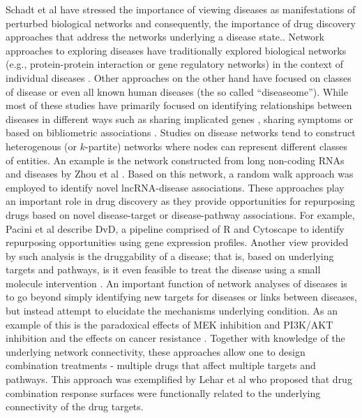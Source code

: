 \documentclass[]{book}
\begin{document}
Schadt et al \cite{Schadt:2009zl} have stressed the importance of
viewing diseases as manifestations of perturbed biological networks
and consequently, the importance of drug discovery approaches that
address the networks underlying a disease state.. Network approaches
to exploring diseases have traditionally explored biological networks
(e.g., protein-protein interaction or gene regulatory networks) in the
context of individual diseases \cite{Lim:2006fe,
  Altieri:2008aa}. Other approaches on the other hand have focused on
classes of disease \cite{Zhang:2013tx} or even all known human
diseases \cite{Goh:2007aa} (the so called ``diseaseome''). While most
of these studies have primarily focused on identifying relationships
between diseases in different ways such as sharing implicated genes
\cite{Bauer-Mehren:2011tv,Goh:2007aa}, sharing symptoms
\cite{Zhou:2014qp} or based on bibliometric associations
\cite{Zhang:2014sh}. Studies on disease networks tend to construct
heterogenous (or $k$-partite) networks where nodes can represent
different classes of entities. An example is the network constructed
from long non-coding RNAs and diseases by Zhou et al
\cite{Zhou:2015if}. Based on this network, a random walk approach was
employed to identify novel lncRNA-disease associations. These
approaches play an important role in drug discovery as they provide
opportunities for repurposing drugs based on novel disease-target or
disease-pathway associations. For example, Pacini et al
\cite{Pacini:2013kl} describe DvD, a pipeline comprised of R and
Cytoscape \cite{Shannon:2003aa} to identify repurposing opportunities
using gene expression profiles. Another view provided by such analysis
is the druggability of a disease; that is, based on underlying targets
and pathways, is it even feasible to treat the disease using a small
molecule intervention \cite{Boran:2010fk}. An important function of
network analyses of diseases is to go beyond simply identifying new
targets for diseases or links between diseases, but instead attempt to
elucidate the mechanisms underlying condition. As an example of this
is the paradoxical effects of MEK inhibition and PI3K/AKT inhibition
and the effects on cancer resistance \cite{Sos:2009gc}. Together with
knowledge of the underlying network connectivity, these approaches
allow one to design combination treatments - multiple drugs that
affect multiple targets and pathways. This approach was exemplified by
Lehar et al \cite{Lehar:2009gu} who proposed that drug combination
response surfaces were functionally related to the underlying
connectivity of the drug targets.
\end{document}
